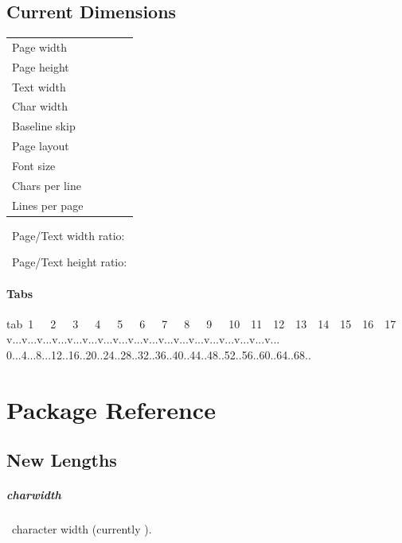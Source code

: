 \documentclass[english,12pt,openany,letterpaper]{book}
\begin{document}
\subsection{Current Dimensions}

\newcommand{\curdim}[1]{%
	\printinunitsof{pt}\prntlen{#1} &%
	\printinunitsof{pc}\prntlen{#1} &%
	\printinunitsof{mm}\prntlen{#1} &%
	\printinunitsof{in}\prntlen{#1}%
}

\begin{tabularx}{\linewidth}{lXXXX}
	Page width		& \curdim{\pdfpagewidth} \\
	Page height		& \curdim{\pdfpageheight} \\
	Text width		& \curdim{\textwidth} \\
	Char width		& \curdim{\charwidth} \\
	Baseline skip	& \curdim{\baselineskip} \\
	Page layout		& \pagelayout \\
	Font size		& \docfontsizeInt \\
	Chars per line	& \cpl \\
	Lines per page	& \lpp \\
\end{tabularx}


~Page/Text width ratio:~ \pgfmathparse{\pdfpagewidth/\textwidth}\pgfmathresult

~Page/Text height ratio: \pgfmathparse{\pdfpageheight/\textheight}\pgfmathresult


\paragraph{Tabs}

tab~1~~~2~~~3~~~4~~~5~~~6~~~7~~~8~~~9~~~10~~11~~12~~13~~14~~15~~16~~17
v...v...v...v...v...v...v...v...v...v...v...v...v...v...v...v...v...v...
0...4...8...12..16..20..24..28..32..36..40..44..48..52..56..60..64..68..

\break

\section{Package Reference}

\subsection{New Lengths}

\subparagraph{\bs charwidth} \dash\ character width (currently \the\charwidth).
\end{document}
